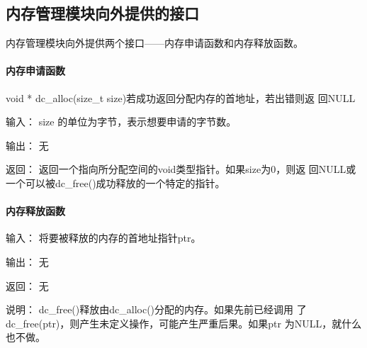 \subsection{内存管理模块向外提供的接口}
内存管理模块向外提供两个接口——内存申请函数和内存释放函数。
\paragraph{内存申请函数}
	{void * dc\_alloc(size\_t size)}{若成功返回分配内存的首地址，若出错则返
	回NULL}
	\begin{compactdesc}
	\item[输入：]size 的单位为字节，表示想要申请的字节数。
	\item[输出：]无
	\item[返回：]返回一个指向所分配空间的void类型指针。如果size为0，则返
	回NULL或一个可以被dc\_free()成功释放的一个特定的指针。
	\end{compactdesc}
\paragraph{内存释放函数}
	\begin{compactdesc}
	\item[输入：]将要被释放的内存的首地址指针ptr。
	\item[输出：]无
	\item[返回：]无
	\item[说明：]dc\_free()释放由dc\_alloc()分配的内存。如果先前已经调用
		了dc\_free(ptr)，则产生未定义操作，可能产生严重后果。如果ptr
		为NULL，就什么也不做。 
	\end{compactdesc}



%
